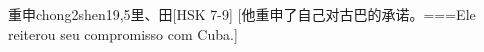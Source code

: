 \begin{EntryWithPhonetic}{重申}{chong2shen1}{9,5}{⾥、⽥}[HSK 7-9]
  [他重申了自己对古巴的承诺。===Ele reiterou seu compromisso com Cuba.]
\end{EntryWithPhonetic}

